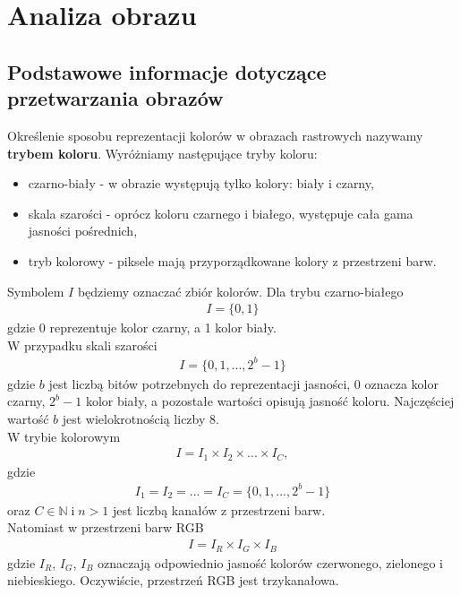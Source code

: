 
\section{Analiza obrazu}
\subsection{Podstawowe informacje dotyczące przetwarzania obrazów}
Określenie sposobu reprezentacji kolorów w obrazach rastrowych nazywamy \textbf{trybem koloru}. Wyróżniamy następujące tryby koloru:
\begin{itemize}
  \item czarno-biały - w obrazie występują tylko kolory: biały i czarny,
  \item skala szarości - oprócz koloru czarnego i białego, występuje cała gama jasności pośrednich,
  \item tryb kolorowy - piksele mają przyporządkowane kolory z przestrzeni barw.
\end{itemize}
Symbolem $I$ będziemy oznaczać zbiór kolorów. Dla trybu czarno-białego
\begin{gather*}
  I = \{0, 1\}
\end{gather*} gdzie 0 reprezentuje kolor czarny, a 1 kolor biały.\\
W przypadku skali szarości
\begin{gather*}
  I = \{0, 1, ..., 2^b-1\}
\end{gather*}
gdzie $b$ jest liczbą bitów potrzebnych do reprezentacji jasności, 0 oznacza kolor czarny, $2^b-1$ kolor biały, a pozostałe wartości opisują jasność koloru. Najczęściej wartość $b$ jest wielokrotnością liczby 8.\\
W trybie kolorowym
\begin{gather*}
  I = I_1 \times I_2 \times ... \times I_C,
\end{gather*}
gdzie
\begin{gather*}
  I_1 = I_2 = ... = I_C = \{0, 1, ..., 2^b-1\}
\end{gather*}
oraz $C \in \mathbb{N} \; \text{i} \; n > 1$ jest liczbą kanałów z przestrzeni barw. \\
Natomiast w przestrzeni barw RGB
\begin{gather*}
  I = I_R \times I_G \times I_B
\end{gather*}
gdzie $I_R$, $I_G$, $I_B$ oznaczają odpowiednio jasność kolorów czerwonego, zielonego i niebieskiego. Oczywiście, przestrzeń RGB jest trzykanałowa.
\\

